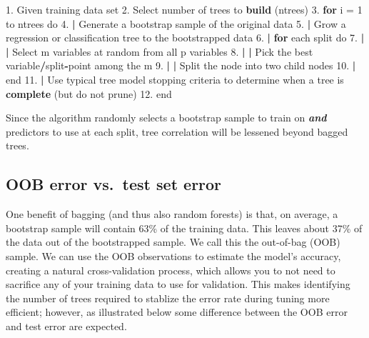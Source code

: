 \documentclass[]{book}
\newenvironment{Shaded}{\begin{snugshade}}{\end{snugshade}}
\newcommand{\ControlFlowTok}[1]{\textcolor[rgb]{0.13,0.29,0.53}{\textbf{#1}}}
\newcommand{\DecValTok}[1]{\textcolor[rgb]{0.00,0.00,0.81}{#1}}
\newcommand{\ErrorTok}[1]{\textcolor[rgb]{0.64,0.00,0.00}{\textbf{#1}}}
\newcommand{\FloatTok}[1]{\textcolor[rgb]{0.00,0.00,0.81}{#1}}
\newcommand{\KeywordTok}[1]{\textcolor[rgb]{0.13,0.29,0.53}{\textbf{#1}}}
\newcommand{\NormalTok}[1]{#1}
\newcommand{\OperatorTok}[1]{\textcolor[rgb]{0.81,0.36,0.00}{\textbf{#1}}}
\newcommand{\StringTok}[1]{\textcolor[rgb]{0.31,0.60,0.02}{#1}}
\theoremstyle{definition}
\theoremstyle{definition}
\theoremstyle{definition}
\theoremstyle{remark}
\begin{document}
\begin{Shaded}
\begin{Highlighting}[]
\FloatTok{1.}\NormalTok{  Given training data set}
\FloatTok{2.}\NormalTok{  Select number of trees to }\KeywordTok{build}\NormalTok{ (ntrees)}
\FloatTok{3.}  \ControlFlowTok{for}\NormalTok{ i =}\StringTok{ }\DecValTok{1}\NormalTok{ to ntrees do}
\FloatTok{4.}  \OperatorTok{|}\StringTok{  }\NormalTok{Generate a bootstrap sample of the original data}
\FloatTok{5.}  \OperatorTok{|}\StringTok{  }\NormalTok{Grow a regression or classification tree to the bootstrapped data}
\FloatTok{6.}  \OperatorTok{|}\StringTok{  }\ControlFlowTok{for}\NormalTok{ each split do}
\FloatTok{7.}  \OperatorTok{|}\StringTok{  }\ErrorTok{|}\StringTok{ }\NormalTok{Select m variables at random from all p variables}
\FloatTok{8.}  \OperatorTok{|}\StringTok{  }\ErrorTok{|}\StringTok{ }\NormalTok{Pick the best variable}\OperatorTok{/}\NormalTok{split}\OperatorTok{-}\NormalTok{point among the m}
\FloatTok{9.}  \OperatorTok{|}\StringTok{  }\ErrorTok{|}\StringTok{ }\NormalTok{Split the node into two child nodes}
\FloatTok{10.} \OperatorTok{|}\StringTok{  }\NormalTok{end}
\FloatTok{11.} \OperatorTok{|}\StringTok{ }\NormalTok{Use typical tree model stopping criteria to determine when a tree is }\KeywordTok{complete}\NormalTok{ (but do not prune)}
\FloatTok{12.}\NormalTok{ end}
\end{Highlighting}
\end{Shaded}

Since the algorithm randomly selects a bootstrap sample to train on
\textbf{\emph{and}} predictors to use at each split, tree correlation
will be lessened beyond bagged trees.

\hypertarget{oob-error-vs.test-set-error}{%
\subsection{OOB error vs.~test set
error}\label{oob-error-vs.test-set-error}}

One benefit of bagging (and thus also random forests) is that, on
average, a bootstrap sample will contain 63\% of the training data. This
leaves about 37\% of the data out of the bootstrapped sample. We call
this the out-of-bag (OOB) sample. We can use the OOB observations to
estimate the model's accuracy, creating a natural cross-validation
process, which allows you to not need to sacrifice any of your training
data to use for validation. This makes identifying the number of trees
required to stablize the error rate during tuning more efficient;
however, as illustrated below some difference between the OOB error and
test error are expected.
\end{document}
